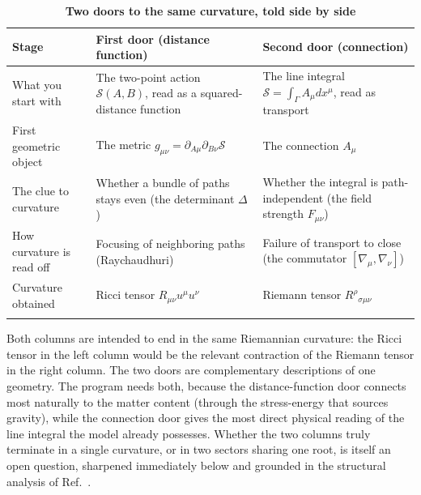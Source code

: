 \documentclass[%
 reprint, amsmath,amssymb, aps, prb, ]{revtex4-2}
\numberwithin{equation}{section}
\begin{document}
\begin{table}[t!]
\centering
\caption{\textbf{Two doors to the same curvature, told side by side}}
\label{tab:routes}
\renewcommand{\arraystretch}{1.4}
\begin{tabular}{p{3.5cm}p{5.5cm}p{6.5cm}}
\toprule
\textbf{Stage} & \textbf{First door (distance function)} & \textbf{Second door (connection)} \\
\midrule
What you start with
& The two-point action $\mathcal{S}(A,B)$, read as a squared-distance function
& The line integral $\mathcal{S}=\int_\Gamma A_\mu dx^\mu$, read as transport \\
\addlinespace[0.3cm]
First geometric object
& The metric $g_{\mu\nu}=\partial_{A\mu}\partial_{B\nu}\mathcal{S}$
& The connection $A_\mu$ \\
\addlinespace[0.3cm]
The clue to curvature
& Whether a bundle of paths stays even (the determinant $\Delta$)
& Whether the integral is path-independent (the field strength $F_{\mu\nu}$) \\
\addlinespace[0.3cm]
How curvature is read off
& Focusing of neighboring paths (Raychaudhuri)
& Failure of transport to close (the commutator $[\nabla_\mu,\nabla_\nu]$) \\
\addlinespace[0.3cm]
Curvature obtained
& Ricci tensor $R_{\mu\nu}u^\mu u^\nu$
& Riemann tensor $R^\rho{}_{\sigma\mu\nu}$ \\
\addlinespace[0.2cm]
\bottomrule
\end{tabular}
\vspace{0.2cm}
\begin{minipage}{0.95\textwidth}
\justifying\footnotesize
Both columns are intended to end in the same Riemannian curvature: the Ricci tensor in the left column would be the relevant contraction of the Riemann tensor in the right column. The two doors are complementary descriptions of one geometry. The program needs both, because the distance-function door connects most naturally to the matter content (through the stress-energy that sources gravity), while the connection door gives the most direct physical reading of the line integral the model already possesses. Whether the two columns truly terminate in a single curvature, or in two sectors sharing one root, is itself an open question, sharpened immediately below and grounded in the structural analysis of Ref.~\cite{hanamura55}.
\end{minipage}
\end{table}
\end{document}
